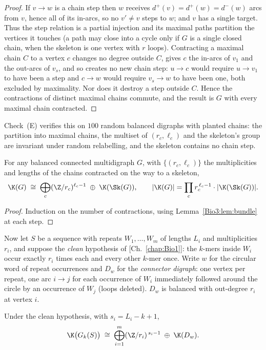 \begin{proof}
If $v\to w$ is a chain step then $w$ receives $d^+(v)=d^+(w)=d^-(w)$ arcs from $v$, hence
all of its in-arcs, so no $v'\ne v$ steps to $w$; and $v$ has a single target. Thus the
step relation is a partial injection and its maximal paths partition the vertices it
touches (a path may close into a cycle only if $G$ is a single closed chain, when the
skeleton is one vertex with $r$ loops). Contracting a maximal chain $C$ to a vertex $c$
changes no degree outside $C$, gives $c$ the in-arcs of $v_1$ and the out-arcs of $v_s$,
and so creates no new chain step: $u\to c$ would require $u\to v_1$ to have been a step
and $c\to w$ would require $v_s\to w$ to have been one, both excluded by maximality. Nor
does it destroy a step outside $C$. Hence the contractions of distinct maximal chains
commute, and the result is $G$ with every maximal chain contracted.
\end{proof}

Check~(E) verifies this on $100$ random balanced digraphs with planted chains: the
partition into maximal chains, the multiset of $(r_c,\ell_c)$ and the skeleton's group are
invariant under random relabelling, and the skeleton contains no chain step.

\begin{theorem}[Splitting]\label{Bio3:thm:split}
For any balanced connected multidigraph $G$, with $\{(r_c,\ell_c)\}$ the multiplicities
and lengths of the chains contracted on the way to a skeleton,
\[
\K(G)\;\cong\;\bigoplus_c(\Z/r_c)^{\ell_c-1}\;\oplus\;\K(\Sk(G)),
\qquad
|\K(G)|=\prod_c r_c^{\,\ell_c-1}\cdot|\K(\Sk(G))|.
\]
\end{theorem}

\begin{proof}
Induction on the number of contractions, using Lemma~\ref{Bio3:lem:bundle} at each step.
\end{proof}

Now let $S$ be a sequence with repeats $W_1,\dots,W_m$ of lengths $L_i$ and
multiplicities $r_i$, and suppose the \emph{clean} hypothesis of [Ch.~\ref{chap:Bio1}]: the $k$-mers
inside $W_i$ occur exactly $r_i$ times each and every other $k$-mer once. Write $w$ for
the circular word of repeat occurrences and $D_w$ for the \emph{connector digraph}: one
vertex per repeat, one arc $i\to j$ for each occurrence of $W_i$ immediately followed
around the circle by an occurrence of $W_j$ (loops deleted). $D_w$ is balanced with
out-degree $r_i$ at vertex $i$.

\begin{corollary}\label{Bio3:cor:clean}
Under the clean hypothesis, with $s_i=L_i-k+1$,
\[
\K\bigl(G_k(S)\bigr)\;\cong\;\bigoplus_{i=1}^{m}(\Z/r_i)^{\,s_i-1}\;\oplus\;\K(D_w).
\]
\end{corollary}

